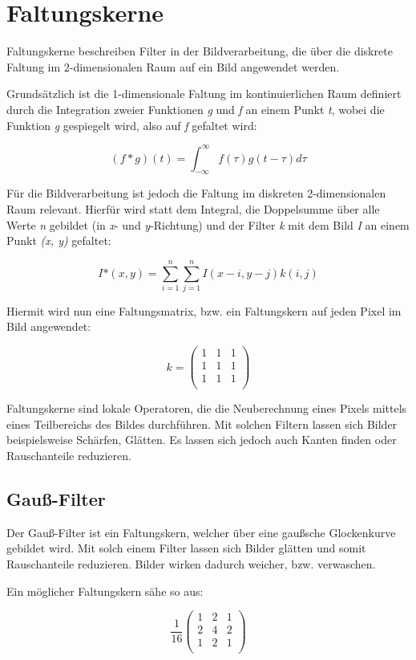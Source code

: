\section{Faltungskerne} %
\label{sec:Faltungskerne}
Faltungskerne beschreiben Filter in der Bildverarbeitung, die über die diskrete Faltung im 2-dimensionalen
Raum auf ein Bild angewendet werden.

Grundsätzlich ist die 1-dimensionale Faltung im kontinuierlichen Raum definiert durch die Integration zweier Funktionen {\em g} und {\em f} an einem Punkt {\em t}, wobei die Funktion {\em g} gespiegelt wird, also auf {\em f} gefaltet wird:

$$ (f * g)(t) = \int_{-\infty}^{\infty} f(\tau)g(t - \tau) d\tau $$

Für die Bildverarbeitung ist jedoch die Faltung im diskreten 2-dimensionalen Raum relevant.
Hierfür wird statt dem Integral, die Doppelsumme über alle Werte {\em n} gebildet (in {\em x}- und {\em y}-Richtung) und der Filter {\em k} mit dem Bild {\em I} an einem Punkt {\em (x, y)} gefaltet:

$$ I\mbox{*}(x, y) = \sum_{i=1}^{n}\sum_{j=1}^{n} I(x - i, y - j)k(i, j) $$

Hiermit wird nun eine Faltungsmatrix, bzw. ein Faltungskern auf jeden Pixel im Bild angewendet:

$$ k = \left( \begin{array}{rrr}
1 & 1 & 1 \\
1 & 1 & 1 \\
1 & 1 & 1 \\
\end{array}\right) $$

Faltungskerne sind lokale Operatoren, die die Neuberechnung eines Pixels mittels eines Teilbereichs des Bildes durchführen.
Mit solchen Filtern lassen sich Bilder beispielsweise Schärfen, Glätten. Es lassen sich jedoch auch Kanten finden oder Rauschanteile reduzieren.

\subsection{Gauß-Filter}
Der Gauß-Filter ist ein Faltungskern, welcher über eine gaußsche Glockenkurve gebildet wird.
Mit solch einem Filter lassen sich Bilder glätten und somit Rauschanteile reduzieren.
Bilder wirken dadurch weicher, bzw. verwaschen.

Ein möglicher Faltungskern sähe so aus:

$$ \frac{1}{16} \left( \begin{array}{rrr}
1 & 2 & 1 \\
2 & 4 & 2 \\
1 & 2 & 1 \\
\end{array}\right) $$

